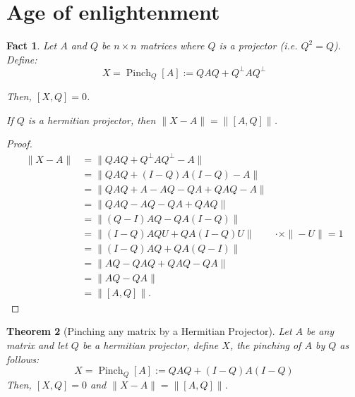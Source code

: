 \documentclass[11pt]{article}
\theoremstyle{plain}
\newtheorem{theorem}{Theorem}[section]
\newtheorem{fact}[theorem]{Fact}
\DeclareMathOperator{\Pinch}{Pinch}
\begin{document}
\section{Age of enlightenment}
\begin{fact}
    Let $A$ and $Q$ be $n \times n$ matrices where $Q$ is a projector (i.e. $Q^2 = Q$). Define:
    \begin{equation}
        X = \Pinch_{Q}[A] := QAQ + Q^\bot AQ^\bot
    \end{equation}
    
    \noindent Then, $[X, Q] = 0$.
    
    \noindent If $Q$ is a hermitian projector, then $\|X - A\| = \|[A,Q]\|$.
\end{fact}
\begin{proof}
    \begin{align*}
    \| X - A \| &= \| QAQ + Q^\bot A Q^\bot - A\|\\
    &= \| QAQ + (I-Q)A(I-Q) - A \|\\
    &= \| QAQ + A - AQ - QA + QAQ - A \|\\
    &= \| QAQ - AQ - QA + QAQ \|\\
    &= \|(Q - I)AQ - QA(I - Q) \|\\
    &= \|(I - Q)AQU + QA(I - Q) U \| & \cdot \times \|-U\| = 1\\
    &= \|(I - Q)AQ + QA(Q - I) \|\\
    &= \| AQ - QAQ + QAQ - QA\|\\
    &= \| AQ - QA\|\\
    &= \|[A, Q] \|.
\end{align*}
\end{proof}
\begin{theorem}[Pinching any matrix by a Hermitian Projector]\label{thm:pinch_herm_proj}
Let $A$ be any matrix and let $Q$ be a hermitian projector, define $X$, the pinching of $A$ by $Q$ as follows:
\begin{equation}
	X = \Pinch_Q[A] := Q A Q + (I - Q) A (I - Q)
\end{equation}
Then, $[X, Q] = 0$ and $\|X - A\| = \|[A, Q]\|$.
\end{theorem}
\end{document}
